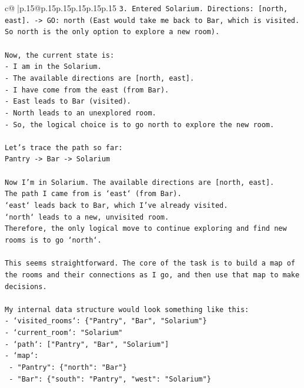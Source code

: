\documentclass{article}
\begin{document}
{\begin{supertabular}{c@{$\;$}|p{.15\linewidth}@{}p{.15\linewidth}p{.15\linewidth}p{.15\linewidth}p{.15\linewidth}p{.15\linewidth}}
{{{\texttt{3. Entered Solarium. Directions: {[}north, east{]}. {-}> GO: north (East would take me back to Bar, which is visited. So north is the only option to explore a new room).} \\
\\ 
\texttt{Now, the current state is:} \\
\texttt{{-} I am in the Solarium.} \\
\texttt{{-} The available directions are {[}north, east{]}.} \\
\texttt{{-} I have come from the east (from Bar).} \\
\texttt{{-} East leads to Bar (visited).} \\
\texttt{{-} North leads to an unexplored room.} \\
\texttt{{-} So, the logical choice is to go north to explore the new room.} \\
\\ 
\texttt{Let's trace the path so far:} \\
\texttt{Pantry {-}> Bar {-}> Solarium} \\
\\ 
\texttt{Now I'm in Solarium. The available directions are {[}north, east{]}.} \\
\texttt{The path I came from is `east` (from Bar).} \\
\texttt{`east` leads back to Bar, which I've already visited.} \\
\texttt{`north` leads to a new, unvisited room.} \\
\texttt{Therefore, the only logical move to continue exploring and find new rooms is to go `north`.} \\
\\ 
\texttt{This seems straightforward. The core of the task is to build a map of the rooms and their connections as I go, and then use that map to make decisions.} \\
\\ 
\texttt{My internal data structure would look something like this:} \\
\texttt{{-} `visited\_rooms`: \{"Pantry", "Bar", "Solarium"\}} \\
\texttt{{-} `current\_room`: "Solarium"} \\
\texttt{{-} `path`: {[}"Pantry", "Bar", "Solarium"{]}} \\
\texttt{{-} `map`:} \\
\texttt{    {-} "Pantry": \{"north": "Bar"\}} \\
\texttt{    {-} "Bar": \{"south": "Pantry", "west": "Solarium"\}} \\
}}}
\end{supertabular}}
\end{document}
